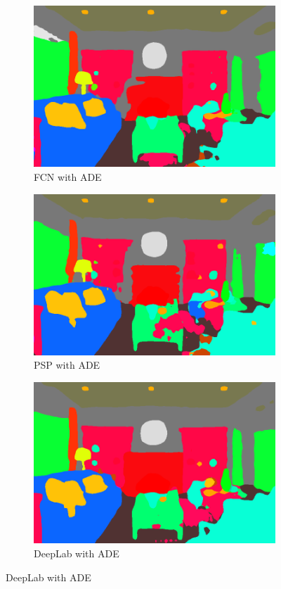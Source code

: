 \documentclass[12pt,a4paper,table,dvipsnames,tikz]{report}
\newcommand{\acronym}{\MakeUppercase}
\begin{document}
\begin{figure}[h!]
\begin{subfigure}[b]{0.3\textwidth}
			\includegraphics[width=\textwidth]{in_ade_fcn}
			\caption{\acronym{fcn} with \acronym{ade}}
		\end{subfigure}
		\begin{subfigure}[b]{0.3\textwidth}
			\includegraphics[width=\textwidth]{in_ade_psp}
			\caption{\acronym{psp} with \acronym{ade}}
		\end{subfigure}
		\begin{subfigure}[b]{0.3\textwidth}
			\includegraphics[width=\textwidth]{in_ade_deep}
			\caption{DeepLab with \acronym{ade}}
		\end{subfigure}
		\label{fig:in}
	\end{figure}
	
\end{document}
